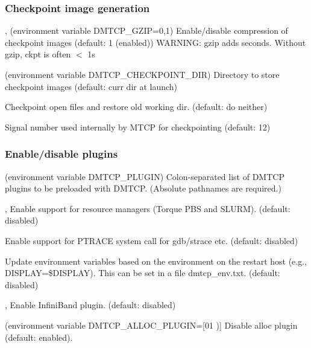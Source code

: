 \subsubsection{Checkpoint image generation}
\begin{Description}
  \item[\Opt{--gzip}, \Opt{--no-gzip} (environment variable DMTCP_GZIP={0,1})]
    Enable/disable compression of checkpoint images (default: 1 (enabled))
    WARNING:  gzip adds seconds.  Without gzip, ckpt is often $<$ 1s
  \item[\OptSArg{--ckptdir}{path} (environment variable DMTCP_CHECKPOINT_DIR)]
    Directory to store checkpoint images (default: curr dir at launch)
  \item[\Opt{--checkpoint-open-files}]
    Checkpoint open files and restore old working dir. (default: do neither)
  \item[\OptSArg{--mtcp-checkpoint-signal}{signum}]
      Signal number used internally by MTCP for checkpointing (default: 12)
\end{Description}

\subsubsection{Enable/disable plugins}
\begin{Description}
  \item[\OptSArg{--with-plugin}{plugins} (environment variable DMTCP_PLUGIN)]
    Colon-separated list of DMTCP plugins to be preloaded with DMTCP.
    (Absolute pathnames are required.)
  \item[\Opt{--batch-queue}, \Opt{--rm}]
    Enable support for resource managers (Torque PBS and SLURM).
    (default: disabled)
  \item[\Opt{--ptrace}]
    Enable support for PTRACE system call for gdb/strace etc. (default: disabled)
  \item[\Opt{--modify-env}]
    Update environment variables based on the environment on the restart host
    (e.g., DISPLAY=\$DISPLAY).  This can be set in a file dmtcp_env.txt.
    (default: disabled)
  \item[\Opt{--ib}, \Opt{--infiniband}]
    Enable InfiniBand plugin. (default: disabled)
  \item[\Opt{--disable-alloc-plugin} (environment variable DMTCP_ALLOC_PLUGIN=[01])]
    Disable alloc plugin (default: enabled).
\end{Description}

